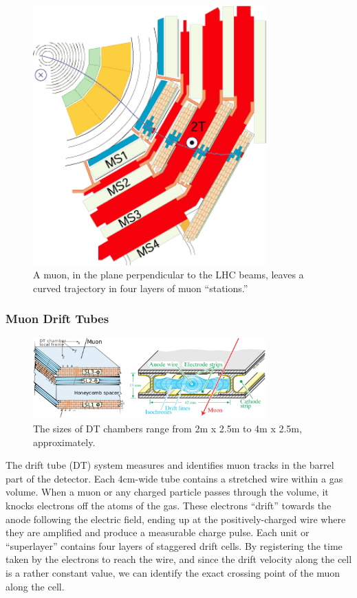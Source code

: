 \begin{figure}
\centering
\includegraphics[width=0.80\textwidth]{figures/MuStations.png}
\caption{A muon, in the plane perpendicular to the LHC beams, leaves a curved trajectory in four layers of  muon ``stations.''}
\label{fig:MuStations}
\end{figure}    

\subsubsection{Muon Drift Tubes}

\begin{figure}
\centering
\includegraphics[width=0.80\textwidth]{figures/DTchambers.png}
\caption{The sizes of DT chambers range from  2m x 2.5m to 4m x 2.5m, approximately.}
\label{fig:DTchambers}
\end{figure}    

The drift tube (DT) system measures and identifies muon tracks in the barrel part of the detector. Each 4cm-wide tube contains a stretched wire within a gas volume. When a muon or any charged particle passes through the volume, it knocks electrons off the atoms of the gas. These electrons ``drift'' towards the anode following the electric field, ending up at the positively-charged wire where they are amplified and produce a measurable charge pulse. Each unit or ``superlayer'' contains four layers of staggered drift cells. By registering the time taken by the electrons to reach the wire, and since the drift velocity along the cell is a rather constant value, we can identify the exact crossing point of the muon along the cell.

